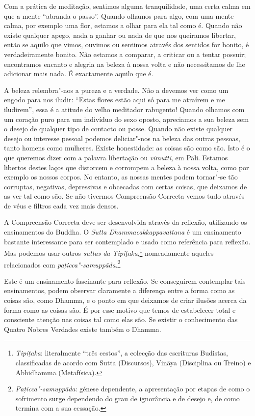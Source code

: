 \sectionBreak

Com a prática de meditação, sentimos alguma tranquilidade, uma certa calma em
que a mente “abranda o passo”. Quando olhamos para algo, com uma mente calma,
por exemplo uma flor, estamos a olhar para ela tal como é. Quando não existe
qualquer apego, nada a ganhar ou nada de que nos queiramos libertar, então se
aquilo que vimos, ouvimos ou sentimos através dos sentidos for bonito, é
verdadeiramente bonito. Não estamos a comparar, a criticar ou a tentar possuir;
encontramos encanto e alegria na beleza à nossa volta e não necessitamos de lhe
adicionar mais nada. É exactamente aquilo que é.

A beleza relembra"-nos a pureza e a verdade. Não a devemos ver como um engodo
para nos iludir: “Estas flores estão aqui só para me atraírem e me iludirem”,
essa é a atitude do velho meditador rabugento! Quando olhamos com um coração
puro para um indivíduo do sexo oposto, apreciamos a sua beleza sem o desejo de
qualquer tipo de contacto ou posse. Quando não existe qualquer desejo ou
interesse pessoal podemos deliciar"-nos na beleza das outras pessoas, tanto
homens como mulheres. Existe honestidade: as coisas são como são. Isto é o que
queremos dizer com a palavra libertação ou \emph{vimutti}, em Pāli. Estamos
libertos destes laços que distorcem e corrompem a beleza à nossa volta, como por
exemplo os nossos corpos. No entanto, as nossas mentes podem tornar"-se tão
corruptas, negativas, depressivas e obcecadas com certas coisas, que deixamos de
as ver tal como são. Se não tivermos Compreensão Correcta vemos tudo através de
véus e filtros cada vez mais densos.

A Compreensão Correcta deve ser desenvolvida através da reflexão, utilizando os
ensinamentos do Buddha. O \emph{Sutta Dhammacakkappavattana} é um ensinamento
bastante interessante para ser contemplado e usado como referência para
reflexão. Mas podemos usar outros \emph{suttas da Tipiṭaka},\footnote{%
  \emph{Tipiṭaka}: literalmente “três cestos”, a colecção das escrituras
  Budistas, classificadas de acordo com Sutta (Discursos), Vināya (Disciplina ou
  Treino) e Abhidhamma (Metafísica).} nomeadamente aqueles relacionados com
\emph{paṭicca"-samuppāda}.\footnote{%
  \emph{Paṭicca"-samuppāda}: génese dependente, a apresentação por etapas de como
  o sofrimento surge dependendo do grau de ignorância e de desejo e, de como
  termina com a sua cessação.}

Este é um ensinamento fascinante para reflexão.
Se conseguirem contemplar tais ensinamentos, podem observar claramente a
diferença entre a forma como as coisas são, como Dhamma, e o ponto em que
deixamos de criar ilusões acerca da forma como as coisas são. É por esse motivo
que temos de estabelecer total e consciente atenção nas coisas tal como elas
são. Se existir o conhecimento das Quatro Nobres Verdades existe também o
Dhamma.

